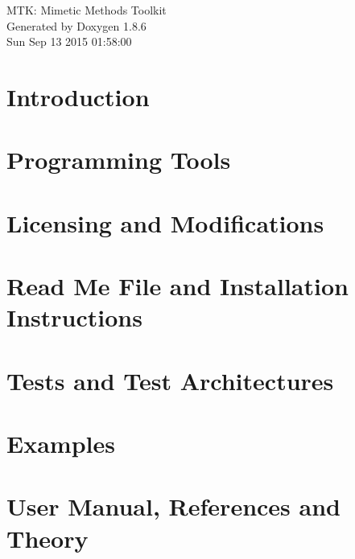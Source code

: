 \documentclass[twoside]{book}
\newcommand{\clearemptydoublepage}{%
  \newpage{\pagestyle{empty}\cleardoublepage}%
}
\begin{document}
\hypersetup{pageanchor=false}
\begin{titlepage}
\vspace*{7cm}
\begin{center}%
{\Large M\-T\-K\-: Mimetic Methods Toolkit }\\
\vspace*{1cm}
{\large Generated by Doxygen 1.8.6}\\
\vspace*{0.5cm}
{\small Sun Sep 13 2015 01:58:00}\\
\end{center}
\end{titlepage}
\clearemptydoublepage
\tableofcontents
\clearemptydoublepage
{}
\hypersetup{pageanchor=true}

\chapter{Introduction}
\label{index}\hypertarget{index}{}
\chapter{Programming Tools}
\label{section_prog_tools}
\hypertarget{section_prog_tools}{}

\chapter{Licensing and Modifications}
\label{section_license_mod}
\hypertarget{section_license_mod}{}

\chapter{Read Me File and Installation Instructions}
\label{page_readme}
\hypertarget{page_readme}{}

\chapter{Tests and Test Architectures}
\label{page_architectures}
\hypertarget{page_architectures}{}

\chapter{Examples}
\label{page_examples}
\hypertarget{page_examples}{}

\chapter{User Manual, References and Theory}
\label{page_ref_the}
\hypertarget{page_ref_the}{}

\end{document}
